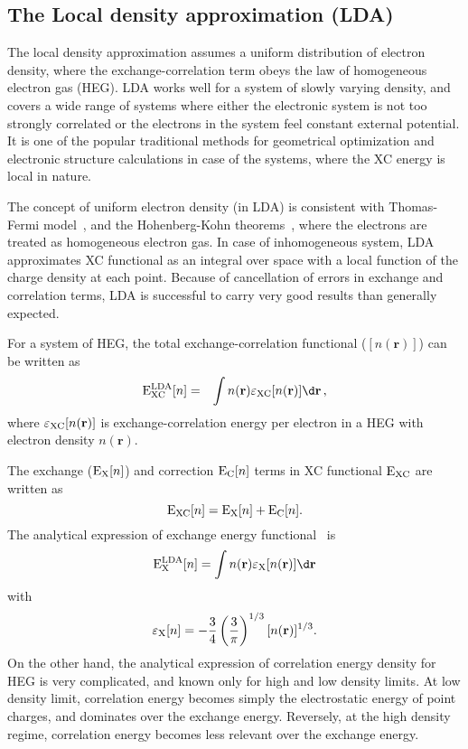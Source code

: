 \subsection{The Local density approximation (LDA)}
The local density approximation assumes a uniform distribution of electron density, where the exchange-correlation term obeys the law of homogeneous electron gas (HEG). LDA works well for a system of slowly varying density, and covers a wide range of systems where either the electronic system is not too strongly correlated or the electrons in the system feel constant external potential. It is one of the popular traditional methods for geometrical optimization and electronic structure calculations in case of the systems, where the
XC energy is local in nature.

\begin{sloppypar}
The concept of uniform electron density (in LDA) is consistent with Thomas-Fermi model~\citep{Fermi1928}, and the Hohenberg-Kohn theorems~\citep{Hohenberg1964}, where the electrons are treated as homogeneous electron gas. In case of inhomogeneous system, LDA approximates XC functional as an integral over space with a local function of the charge density at each point. Because of cancellation of errors in exchange and correlation terms, LDA is successful to carry very good results than generally expected.
\end{sloppypar}

For a system of HEG, the total exchange-correlation functional ($[n(\textbf{r})]$) can be written as
\begin{eqnarray}
{\rm E}_{\rm XC}^{\rm LDA}[n] & = & \int n(\textbf{r})\varepsilon_{\rm XC}[n(\textbf{r})]\d\textbf{r}\, ,
\end{eqnarray}
where $\varepsilon_{\rm XC}[n(\textbf{r})]$ is exchange-correlation energy per electron in a HEG with electron density $n(\textbf{r})$.

The exchange (${\rm E}_{\rm X}[n]$) and correction ${\rm E}_{\rm C}[n]$ terms in XC functional ${\rm E}_{\rm XC}$ are written as
\begin{equation}
{\rm E}_{\rm XC}[n] = {\rm E}_{\rm X}[n] + {\rm E}_{\rm C}[n].
\end{equation}
The analytical expression of exchange energy functional~\citep{Dirac1930} is
\begin{eqnarray}
{\rm E}_{\rm X}^{\rm LDA}[n] =  \int n(\textbf{r})\varepsilon_{\rm X}[n(\textbf{r})]\d\textbf{r}
\end{eqnarray}
with 
\begin{equation}\label{LDAexn}
\varepsilon_{\rm X}[n] = -\frac{3}{4}\left(\frac{3}{\pi}\right)^{1/3}[n(\textbf{r})]^{1/3}.
\end{equation}
On the other hand, the analytical expression of correlation energy density for HEG is very complicated, and known only for high and low density limits. At low density limit, correlation energy becomes simply the electrostatic energy of point charges, and dominates over the exchange energy. Reversely, at the high density regime, correlation energy becomes less relevant over the exchange energy.

